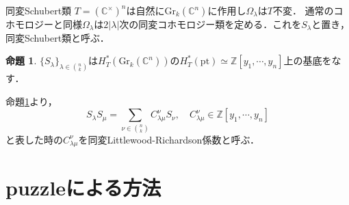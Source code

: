 \documentclass[unicode,12pt]{beamer}%
\theoremstyle{definition}
\newtheorem{prop}[defin]{命題}
\theoremstyle{example}
\newcommand{\integer}{\mathbb{Z}}
\newcommand{\complex}{\mathbb{C}}
\begin{document}
\begin{frame}{同変Schubert類}
  $T=(\complex^\times)^n$は自然に$\text{Gr}_k(\complex^n)$に作用し$\Omega_\lambda$は$T$不変．
  通常のコホモロジーと同様$\Omega_\lambda$は$2|\lambda|$次の同変コホモロジー類を定める．これを$S_\lambda$と置き，同変Schubert類と呼ぶ．
  \begin{prop}\label{basis theorem}
    $\{S_\lambda\}_{\lambda\in\binom{n}{k}}$は$H^*_T(\text{Gr}_k(\complex^n))$の$H^*_T(\text{pt})\simeq\integer[y_1,\cdots,y_n]$上の基底をなす．
  \end{prop}
  命題\ref{basis theorem}より，
  \[
    S_\lambda S_\mu = \sum_{\nu\in\binom{n}{k}}C^\nu_{\lambda\mu}S_\nu,\quad C^\nu_{\lambda\mu}\in\integer[y_1,\cdots,y_n]
  \]
  と表した時の$C^\nu_{\lambda\mu}$を同変Littlewood-Richardson係数と呼ぶ．
\end{frame}

\section[]{puzzleによる方法}
\end{document}
